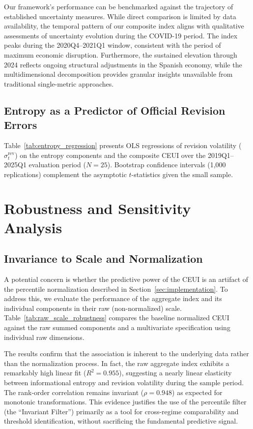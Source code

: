 \documentclass[12pt,a4paper]{article}
\theoremstyle{remark}
\begin{document}
Our framework's performance can be benchmarked against the trajectory of established uncertainty measures. While direct comparison is limited by data availability, the temporal pattern of our composite index aligns with qualitative assessments of uncertainty evolution during the COVID-19 period. The index peaks during the 2020Q4--2021Q1 window, consistent with the period of maximum economic disruption. Furthermore, the sustained elevation through 2024 reflects ongoing structural adjustments in the Spanish economy, while the multidimensional decomposition provides granular insights unavailable from traditional single-metric approaches.

\subsection{Entropy as a Predictor of Official Revision Errors}
\label{sec:entropy_revisions}

Table~\ref{tab:entropy_regression} presents OLS regressions of revision volatility
($\sigma^{\text{rev}}_t$) on the entropy components and the composite CEUI over the
2019Q1--2025Q1 evaluation period ($N = 25$). Bootstrap confidence intervals
(1{,}000 replications) complement the asymptotic $t$-statistics given the small sample.

\section{Robustness and Sensitivity Analysis}
\label{sec:robustness}

\subsection{Invariance to Scale and Normalization}
\label{sec:scale_robustness}

A potential concern is whether the predictive power of the CEUI is an artifact of the percentile normalization described in Section~\ref{sec:implementation}. To address this, we evaluate the performance of the aggregate index and its individual components in their raw (non-normalized) scale. Table~\ref{tab:raw_scale_robustness} compares the baseline normalized CEUI against the raw summed components and a multivariate specification using individual raw dimensions.

The results confirm that the association is inherent to the underlying data rather than the normalization process. In fact, the raw aggregate index exhibits a remarkably high linear fit ($R^2 = 0.955$), suggesting a nearly linear elasticity between informational entropy and revision volatility during the sample period. The rank-order correlation remains invariant ($\rho = 0.948$) as expected for monotonic transformations. This evidence justifies the use of the percentile filter (the ``Invariant Filter'') primarily as a tool for cross-regime comparability and threshold identification, without sacrificing the fundamental predictive signal.
\end{document}
